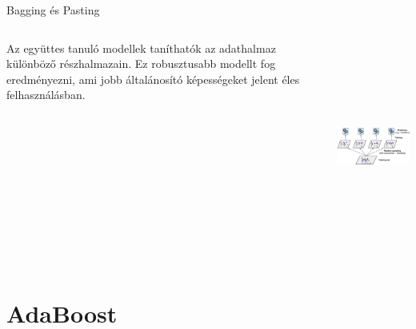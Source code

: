 \documentclass[english, aspectratio=169]{beamer}
\makeatletter
\let\origtableofcontents=\tableofcontents
\def\tableofcontents{\@ifnextchar[{\origtableofcontents}{\gobbletableofcontents}}
\def\gobbletableofcontents#1{\origtableofcontents}
\makeatother
\begin{document}
\begin{frame}{Bagging és Pasting}
\begin{columns}
\begin{column}{.5\textwidth}
Az együttes tanuló modellek taníthatók az adathalmaz különböző részhalmazain. Ez robusztusabb modellt fog eredményezni, ami jobb általánosító képességeket jelent éles felhasználásban.
\end{column}
\begin{column}{.5\textwidth}
\begin{center}
\includegraphics[width=7cm, height=7cm, keepaspectratio]{images/ensemble_4.png}
\end{center}
\end{column}
\end{columns}
\end{frame}

\section{AdaBoost}

\begin{frame}
\tableofcontents[currentsection]
\end{frame}
\end{document}

